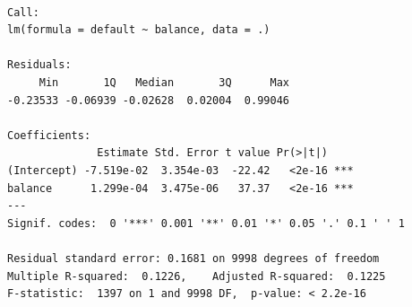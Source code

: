 \documentclass[
  letterpaper,
  DIV=11,
  numbers=noendperiod]{scrreprt}
\newenvironment{Shaded}{\begin{snugshade}}{\end{snugshade}}
\newcommand{\AttributeTok}[1]{\textcolor[rgb]{0.65,0.35,0.00}{#1}}
\newcommand{\DecValTok}[1]{\textcolor[rgb]{0.47,0.16,0.63}{#1}}
\newcommand{\FloatTok}[1]{\textcolor[rgb]{0.65,0.35,0.00}{#1}}
\newcommand{\FunctionTok}[1]{\textcolor[rgb]{0.02,0.16,0.49}{#1}}
\newcommand{\NormalTok}[1]{\textcolor[rgb]{0.33,0.33,0.33}{#1}}
\newcommand{\OtherTok}[1]{\textcolor[rgb]{0.85,0.12,0.09}{#1}}
\newcommand{\SpecialCharTok}[1]{\textcolor[rgb]{0.00,0.46,0.62}{#1}}
\newcommand{\StringTok}[1]{\textcolor[rgb]{0.00,0.50,0.00}{#1}}
\begin{document}
\begin{verbatim}

Call:
lm(formula = default ~ balance, data = .)

Residuals:
     Min       1Q   Median       3Q      Max 
-0.23533 -0.06939 -0.02628  0.02004  0.99046 

Coefficients:
              Estimate Std. Error t value Pr(>|t|)    
(Intercept) -7.519e-02  3.354e-03  -22.42   <2e-16 ***
balance      1.299e-04  3.475e-06   37.37   <2e-16 ***
---
Signif. codes:  0 '***' 0.001 '**' 0.01 '*' 0.05 '.' 0.1 ' ' 1

Residual standard error: 0.1681 on 9998 degrees of freedom
Multiple R-squared:  0.1226,    Adjusted R-squared:  0.1225 
F-statistic:  1397 on 1 and 9998 DF,  p-value: < 2.2e-16
\end{verbatim}

\begin{Shaded}
\end{Shaded}
\end{document}
